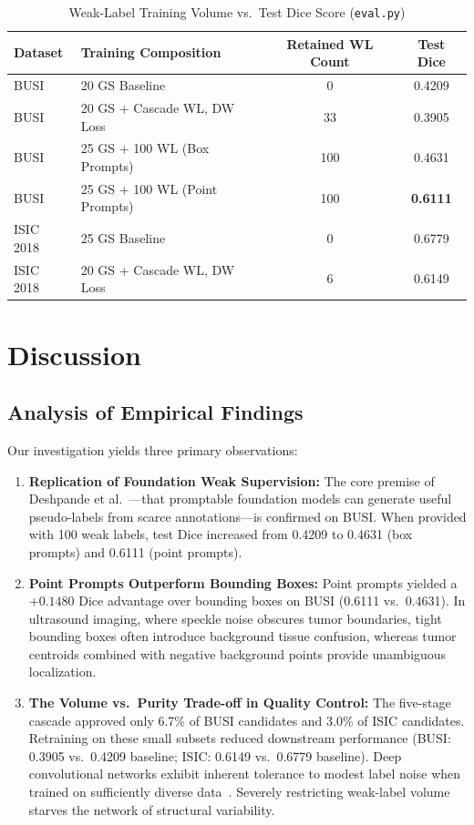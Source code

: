 \documentclass[journal,11pt,onecolumn,draftclsnofoot]{IEEEtran}
\begin{document}
\begin{table}[t]
\renewcommand{\arraystretch}{1.15}
\caption{Weak-Label Training Volume vs.\ Test Dice Score (\texttt{eval.py})}
\label{tab:count}
\centering\footnotesize
\begin{tabular}{@{}llcc@{}}
\toprule
Dataset & Training Composition & Retained WL Count & Test Dice \\
\midrule
BUSI & 20 GS Baseline & 0 & 0.4209 \\
BUSI & 20 GS + Cascade WL, DW Loss & 33 & 0.3905 \\
BUSI & 25 GS + 100 WL (Box Prompts) & 100 & 0.4631 \\
BUSI & 25 GS + 100 WL (Point Prompts) & 100 & \textbf{0.6111} \\
\midrule
ISIC 2018 & 25 GS Baseline & 0 & 0.6779 \\
ISIC 2018 & 20 GS + Cascade WL, DW Loss & 6 & 0.6149 \\
\bottomrule
\end{tabular}
\end{table}

\section{Discussion}
\label{sec:discussion}

\subsection{Analysis of Empirical Findings}
Our investigation yields three primary observations:
\begin{enumerate}
    \item \textbf{Replication of Foundation Weak Supervision:} The core premise of Deshpande et al.~\cite{deshpande2024}---that promptable foundation models can generate useful pseudo-labels from scarce annotations---is confirmed on BUSI. When provided with 100 weak labels, test Dice increased from 0.4209 to 0.4631 (box prompts) and 0.6111 (point prompts).
    \item \textbf{Point Prompts Outperform Bounding Boxes:} Point prompts yielded a $+0.1480$ Dice advantage over bounding boxes on BUSI (0.6111 vs.\ 0.4631). In ultrasound imaging, where speckle noise obscures tumor boundaries, tight bounding boxes often introduce background tissue confusion, whereas tumor centroids combined with negative background points provide unambiguous localization.
    \item \textbf{The Volume vs.\ Purity Trade-off in Quality Control:} The five-stage cascade approved only 6.7\% of BUSI candidates and 3.0\% of ISIC candidates. Retraining on these small subsets reduced downstream performance (BUSI: 0.3905 vs.\ 0.4209 baseline; ISIC: 0.6149 vs.\ 0.6779 baseline). Deep convolutional networks exhibit inherent tolerance to modest label noise when trained on sufficiently diverse data~\cite{arpit2017}. Severely restricting weak-label volume starves the network of structural variability.
\end{enumerate}
\end{document}
